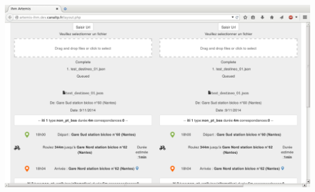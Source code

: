\documentclass[table]{beamer}
\begin{document}
\begin{frame}
\begin{description}
\begin{itemize}
\begin{center}
            \includegraphics[height=0.24\textheight]{images/ihm-artemis}
          \end{center}
      \end{itemize}
  \end{description}
\end{frame}
\end{document}
